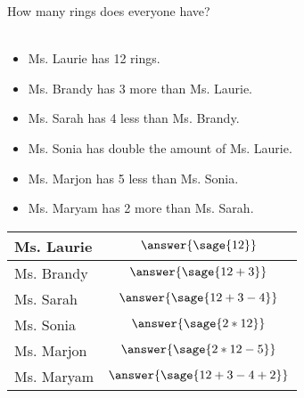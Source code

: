 \documentclass{ximera}
\begin{document}
\begin{problem}
How many rings does everyone have?
\\
\\
\begin{minipage}[c]{0.5\textwidth}
\begin{itemize}
    \item Ms. Laurie has 12 rings. 
    \item Ms. Brandy has 3 more than Ms. Laurie.
    \item Ms. Sarah has 4 less than Ms. Brandy.
    \item Ms. Sonia has double the amount of Ms. Laurie.
    \item Ms. Marjon has 5 less than Ms. Sonia.
    \item Ms. Maryam has 2 more than Ms. Sarah.
\end{itemize}
\end{minipage}
\hfill
\begin{minipage}[c]{0.3\textwidth}
\begin{tabular}{|l|c|}
\hline 
Ms. Laurie &  $\answer{\sage{12}}$ \\
\hline 
Ms. Brandy &  $\answer{\sage{12+3}}$\\
\hline
Ms. Sarah &  $\answer{\sage{12+3-4}}$\\
\hline
Ms. Sonia &  $\answer{\sage{2*12}}$\\
\hline
Ms. Marjon &  $\answer{\sage{2*12-5}}$\\
\hline
Ms. Maryam &  $\answer{\sage{12+3-4+2}}$\\
\hline
\end{tabular}
\end{minipage}
\end{problem}
\end{document}
